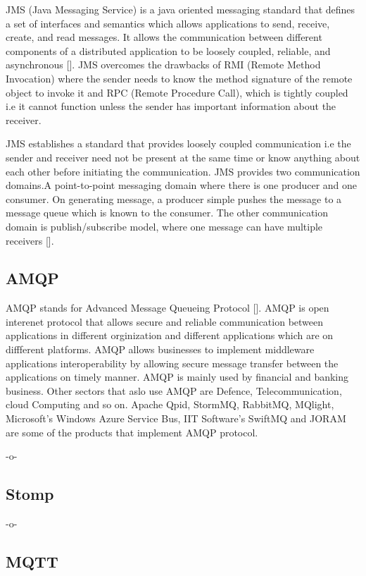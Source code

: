 JMS (Java Messaging Service) is a java oriented messaging standard
that defines a set of interfaces and semantics which allows
applications to send, receive, create, and read messages.  It allows
the communication between different components of a distributed
application to be loosely coupled, reliable, and asynchronous
[\cite{www-jms-wiki}]. JMS overcomes the drawbacks of RMI (Remote
Method Invocation) where the sender needs to know the method signature
of the remote object to invoke it and RPC (Remote Procedure Call),
which is tightly coupled i.e it cannot function unless the sender has
important information about the receiver.

JMS establishes a standard that provides loosely coupled communication
i.e the sender and receiver need not be present at the same time or
know anything about each other before initiating the communication.
JMS provides two communication domains.A point-to-point messaging
domain where there is one producer and one consumer. On generating
message, a producer simple pushes the message to a message queue which
is known to the consumer. The other communication domain is
publish/subscribe model, where one message can have multiple
receivers [\cite{www-jms-oracle-docs}].

\subsection{AMQP}

AMQP stands for Advanced Message Queueing
Protocol [\cite{www-amqp}]. AMQP is open interenet protocol that allows
secure and reliable communication between applications in different
orginization and different applications which are on diffferent
platforms. AMQP allows businesses to implement middleware applications
interoperability by allowing secure message transfer between the
applications on timely manner. AMQP is mainly used by financial and
banking business. Other sectors that aslo use AMQP are Defence,
Telecommunication, cloud Computing and so on.  Apache Qpid, StormMQ,
RabbitMQ, MQlight, Microsoft's Windows Azure Service Bus, IIT
Software's SwiftMQ and JORAM are some of the products that implement
AMQP protocol.

     -o-

\subsection{Stomp}

-o- 

\subsection{MQTT}
     
